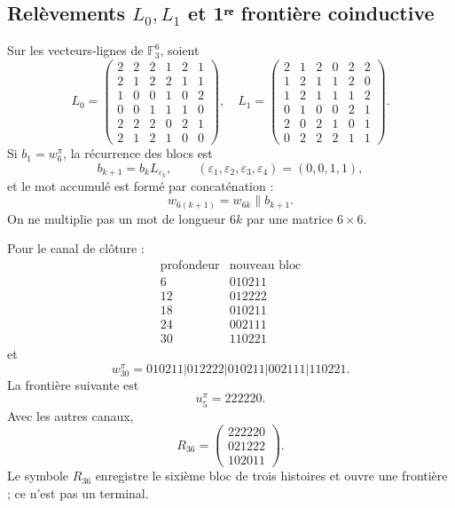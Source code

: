 \subsection{Relèvements \(L_0,L_1\) et 1ʳᵉ frontière coinductive}

Sur les vecteurs-lignes de \(\mathbb F_3^6\), soient
\[
L_0=
\begin{pmatrix}
2&2&2&1&2&1\\
2&1&2&2&1&1\\
1&0&0&1&0&2\\
0&0&1&1&1&0\\
2&2&2&0&2&1\\
2&1&2&1&0&0
\end{pmatrix},
\quad
L_1=
\begin{pmatrix}
2&1&2&0&2&2\\
1&2&1&1&2&0\\
1&2&1&1&1&2\\
0&1&0&0&2&1\\
2&0&2&1&0&1\\
0&2&2&2&1&1
\end{pmatrix}.
\]
Si \(b_1=w_6^\pi\), la récurrence des blocs est
\[
 b_{k+1}=b_kL_{\varepsilon_k},
 \qquad
 (\varepsilon_1,\varepsilon_2,\varepsilon_3,\varepsilon_4)=(0,0,1,1),
\]
et le mot accumulé est formé par concaténation :
\[
 w_{6(k+1)}=w_{6k}\mathbin{\|}b_{k+1}.
\]
On ne multiplie pas un mot de longueur \(6k\) par une matrice \(6\times6\).

Pour le canal de clôture :
\[
\begin{array}{c|c}
\text{profondeur}&\text{nouveau bloc}\\ \hline
6&010211\\
12&012222\\
18&010211\\
24&002111\\
30&110221
\end{array}
\]
et
\begin{equation}
 \boxed{
 w_{30}^{\pi}
 =010211|012222|010211|002111|110221.}
 \label{p12-83-c9-s1:eq:w30-pi-autonomo}
\end{equation}
La frontière suivante est
\[
 u_5^\pi=222220.
\]
Avec les autres canaux,
\[
 R_{36}=
 \begin{pmatrix}
 222220\\021222\\102011
 \end{pmatrix}.
\]
Le symbole \(R_{36}\) enregistre le sixième bloc de trois histoires et ouvre une
frontière ; ce n’est pas un terminal.

